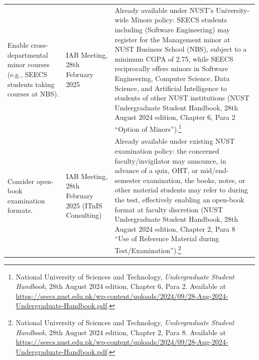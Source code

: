 \begin{longtable}[]{@{}>{\raggedright\arraybackslash}p{}>{\raggedright\arraybackslash}p{}>{\raggedright\arraybackslash}p{}@{}}
\addlinespace
Enable cross-departmental minor courses (e.g., SEECS students taking courses at NBS). & IAB Meeting, 28th February 2025 & Already available under NUST's University-wide Minors policy: SEECS students including (Software Engineering) may register for the Management minor at NUST Business School (NBS), subject to a minimum CGPA of 2.75, while SEECS reciprocally offers minors in Software Engineering, Computer Science, Data Science, and Artificial Intelligence to students of other NUST institutions (NUST Undergraduate Student Handbook, 28th August 2024 edition, Chapter 6, Para 2 ``Option of Minors'').\footnote{National University of Sciences and Technology, \textit{Undergraduate Student Handbook}, 28th August 2024 edition, Chapter 6, Para 2. Available at \url{https://seecs.nust.edu.pk/wp-content/uploads/2024/09/28-Aug-2024-Undergraduate-Handbook.pdf}.}\\
\addlinespace
Consider open-book examination formats. & IAB Meeting, 28th February 2025 (ITnIS Consulting) & Already available under existing NUST examination policy: the concerned faculty/invigilator may announce, in advance of a quiz, OHT, or mid/end-semester examination, the books, notes, or other material students may refer to during the test, effectively enabling an open-book format at faculty discretion (NUST Undergraduate Student Handbook, 28th August 2024 edition, Chapter 2, Para 8 ``Use of Reference Material during Test/Examination'').\footnote{National University of Sciences and Technology, \textit{Undergraduate Student Handbook}, 28th August 2024 edition, Chapter 2, Para 8. Available at \url{https://seecs.nust.edu.pk/wp-content/uploads/2024/09/28-Aug-2024-Undergraduate-Handbook.pdf}.}\\
\end{longtable}
\endgroup

